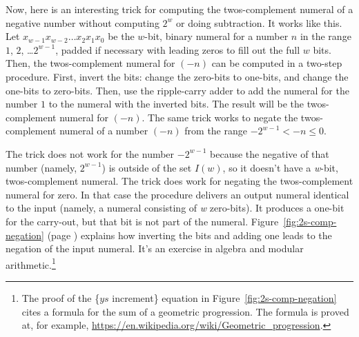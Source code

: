 Now, here is an interesting
trick for computing the twos-complement numeral of a negative number without
computing $2^w$ or doing subtraction.
It works like this.
Let $x_{w-1}x_{w-2} \dots x_2x_1x_0$
be the $w$-bit, binary numeral for a number $n$ in the range $1$, $2$, \dots $2^{w-1}$,
padded if necessary with leading zeros to fill out the full $w$ bits.
Then, the twos-complement numeral for $(-n)$ can be computed
in a two-step procedure.
First, invert the bits: change the zero-bits to one-bits,
and change the one-bits to zero-bits.
Then, use the ripple-carry adder to add the numeral for the number $1$
to the numeral with the inverted bits.
The result will be the twos-complement numeral for $(-n)$.
The same trick works to negate the twos-complement numeral
of a number $(-n)$ from the range $-2^{w-1} < -n \leq 0$.

The trick does not work for the number $-2^{w-1}$
because the negative of that number (namely, $2^{w-1}$)
is outside of the set $I(w)$,
so it doesn't have a \emph{w}-bit, twos-complement numeral.
The trick does work for negating the twos-complement numeral for zero.
In that case the procedure delivers an output numeral identical
to the input (namely, a numeral consisting of \emph{w} zero-bits).
It produces a one-bit for the carry-out, but that bit is not part of the numeral.
Figure~\ref{fig:2s-comp-negation}
(page \pageref{fig:2s-comp-negation})
explains how inverting the bits and adding one leads to the negation
of the input numeral.
It's an exercise in algebra and modular arithmetic.\footnote{The
proof of the \{$ys$ increment\} equation
in Figure~\ref{fig:2s-comp-negation}
cites a formula for the sum of a geometric progression.
The formula is proved at, for example, \url{https://en.wikipedia.org/wiki/Geometric_progression}.}

